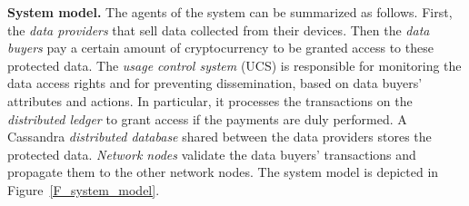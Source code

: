 \begin{table}[h]
      \caption{Measures of transaction time (averages) for each configuration with different networks sizes}
      \label{tab:measures}
    \end{table}   

\textbf{System model.}
The agents of the system can be summarized as follows. First, the \emph{data providers} that sell data collected from their devices. Then the \emph{data buyers} pay a certain amount of cryptocurrency to be granted access to these protected data.
 The \emph{usage control system} (UCS) is responsible for monitoring the data access rights and for preventing dissemination, based on data buyers' attributes and actions. 
In particular, it processes the transactions on the \emph{distributed ledger} to grant access if the payments are duly performed. A Cassandra \emph{distributed database} shared between the data providers stores the protected data. \emph{Network nodes} validate the data buyers' transactions and propagate them to the other network nodes. The system model is depicted in Figure~\ref{F_system_model}.


